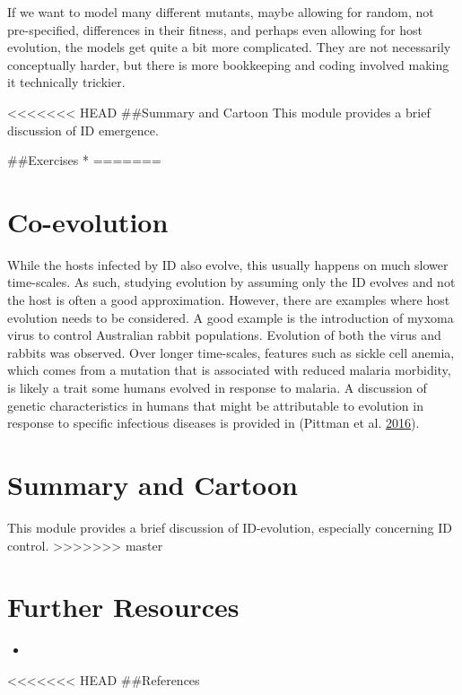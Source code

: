 \documentclass[]{book}
\theoremstyle{definition}
\theoremstyle{definition}
\theoremstyle{definition}
\theoremstyle{remark}
\begin{document}
If we want to model many different mutants, maybe allowing for random,
not pre-specified, differences in their fitness, and perhaps even
allowing for host evolution, the models get quite a bit more
complicated. They are not necessarily conceptually harder, but there is
more bookkeeping and coding involved making it technically trickier.

<<<<<<< HEAD
\#\#Summary and Cartoon This module provides a brief discussion of ID
emergence.

\#\#Exercises *
=======
\section{Co-evolution}\label{co-evolution}

While the hosts infected by ID also evolve, this usually happens on much
slower time-scales. As such, studying evolution by assuming only the ID
evolves and not the host is often a good approximation. However, there
are examples where host evolution needs to be considered. A good example
is the introduction of myxoma virus to control Australian rabbit
populations. Evolution of both the virus and rabbits was observed. Over
longer time-scales, features such as sickle cell anemia, which comes
from a mutation that is associated with reduced malaria morbidity, is
likely a trait some humans evolved in response to malaria. A discussion
of genetic characteristics in humans that might be attributable to
evolution in response to specific infectious diseases is provided in
(Pittman et al. \protect\hyperlink{ref-pittman16}{2016}).

\section{Summary and Cartoon}\label{summary-and-cartoon-13}

This module provides a brief discussion of ID-evolution, especially
concerning ID control.
>>>>>>> master

\hypertarget{further-resources-9}{%
\section{Further Resources}\label{further-resources-9}}

\begin{itemize}
\item
\end{itemize}

<<<<<<< HEAD
\#\#References
\end{document}
